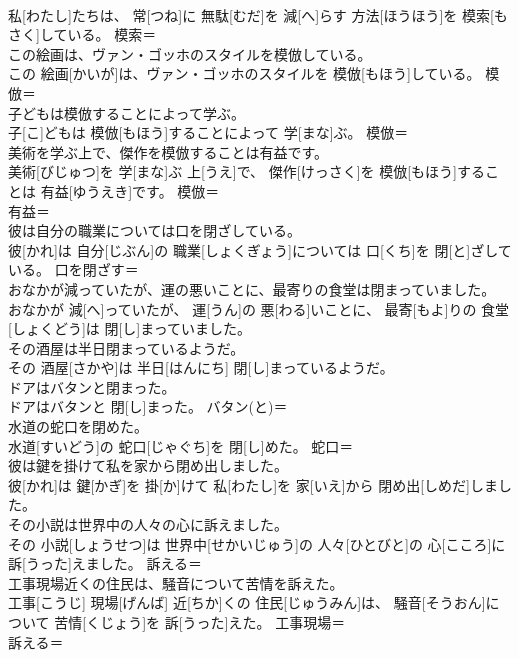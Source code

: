 \documentclass[8pt]{extreport}
\begin{document}
\begin{CJK}{UTF8}{min}
\\	私[わたし]たちは、 常[つね]に 無駄[むだ]を 減[へ]らす 方法[ほうほう]を 模索[もさく]している。	模索＝ 
\\	この絵画は、ヴァン・ゴッホのスタイルを模倣している。	
\\	この 絵画[かいが]は、ヴァン・ゴッホのスタイルを 模倣[もほう]している。	模倣＝ 
\\	子どもは模倣することによって学ぶ。	
\\	子[こ]どもは 模倣[もほう]することによって 学[まな]ぶ。	模倣＝ 
\\	美術を学ぶ上で、傑作を模倣することは有益です。	
\\	美術[びじゅつ]を 学[まな]ぶ 上[うえ]で、 傑作[けっさく]を 模倣[もほう]することは 有益[ゆうえき]です。	模倣＝ 
\\	有益＝ 
\\	彼は自分の職業については口を閉ざしている。	
\\	彼[かれ]は 自分[じぶん]の 職業[しょくぎょう]については 口[くち]を 閉[と]ざしている。	口を閉ざす＝ 
\\	おなかが減っていたが、運の悪いことに、最寄りの食堂は閉まっていました。	
\\	おなかが 減[へ]っていたが、 運[うん]の 悪[わる]いことに、 最寄[もよ]りの 食堂[しょくどう]は 閉[し]まっていました。	
\\	その酒屋は半日閉まっているようだ。	
\\	その 酒屋[さかや]は 半日[はんにち] 閉[し]まっているようだ。	
\\	ドアはバタンと閉まった。	
\\	ドアはバタンと 閉[し]まった。	バタン(と)＝ 
\\	水道の蛇口を閉めた。	
\\	水道[すいどう]の 蛇口[じゃぐち]を 閉[し]めた。	蛇口＝ 
\\	彼は鍵を掛けて私を家から閉め出しました。	
\\	彼[かれ]は 鍵[かぎ]を 掛[か]けて 私[わたし]を 家[いえ]から 閉め出[しめだ]しました。	
\\	その小説は世界中の人々の心に訴えました。	
\\	その 小説[しょうせつ]は 世界中[せかいじゅう]の 人々[ひとびと]の 心[こころ]に 訴[うった]えました。	訴える＝ 
\\	工事現場近くの住民は、騒音について苦情を訴えた。	
\\	工事[こうじ] 現場[げんば] 近[ちか]くの 住民[じゅうみん]は、 騒音[そうおん]について 苦情[くじょう]を 訴[うった]えた。	工事現場＝ 
\\	訴える＝ 

\end{CJK}
\end{document}
